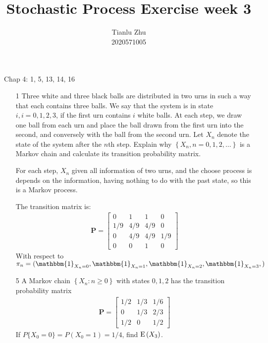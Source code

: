 \documentclass[en,hazy,blue,12pt,device = normal]{elegantnote}
\title{Stochastic Process Exercise week 3}
\author{Tianlu Zhu \\ 2020571005}
\date{}
\begin{document}
\maketitle
Chap 4: 1, 5, 13, 14, 16
\begin{enumerate}
    \item[1] Three white and three black balls are distributed in two urns in such a way that each contains three balls. We say that the system is in state \(i, i=0,1,2,3\), if the first urn contains \(i\) white balls. At each step, we draw one ball from each urn and place the ball drawn from the first urn into the second, and conversely with the ball from the second urn. Let \(X_n\) denote the state of the system after the \(n\)th step. Explain why \(\left\{X_n, n=0,1,2, \ldots\right\}\) is a Markov chain and calculate its transition probability matrix.
    
    \begin{tcolorbox}
        \sol 

        For each step, \(X_n\) given all information of two urns, and the choose process is depends on the information, having nothing to do with the past state, so this is a Markov process.

        The transition matrix is:
        \begin{align*}
            \textbf{P} = \begin{bmatrix}
                0&1&1&0 \\
                1/9&4/9&4/9&0 \\
                0&4/9&4/9&1/9\\
                0&0&1&0
            \end{bmatrix}
        \end{align*}
        With respect to \(\pi_n = (\mathbbm{1}_{X_n = 0},\mathbbm{1}_{X_n = 1},\mathbbm{1}_{X_n = 2},\mathbbm{1}_{X_n = 3},)\)
    \end{tcolorbox}

    \item[5] A Markov chain \(\left\{X_n:n\geq 0 \right\}\) with states \(0,1,2\) has the transition probability matrix
    \begin{align*}
        \textbf{P} = \begin{bmatrix}
            1/2 & 1/3 & 1/6 \\
            0& 1/3 & 2/3\\
            1/2 & 0 &1/2
        \end{bmatrix}
    \end{align*}
    If \(P\{X_0 = 0\}= P(X_0 = 1) = 1/4\), find \(\operatorname E\left(X_3\right)\).


\end{enumerate}
\end{document}
